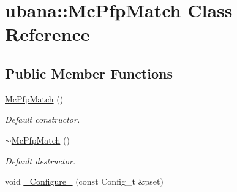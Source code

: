 \hypertarget{classubana_1_1McPfpMatch}{\section{ubana\-:\-:Mc\-Pfp\-Match Class Reference}
\label{classubana_1_1McPfpMatch}
}
\subsection*{Public Member Functions}
\begin{DoxyCompactItemize}
\item 
\hypertarget{classubana_1_1McPfpMatch_aea3e9923fdf8855d5798015b36f2d516}{\hyperlink{classubana_1_1McPfpMatch_aea3e9923fdf8855d5798015b36f2d516}{Mc\-Pfp\-Match} ()}\label{classubana_1_1McPfpMatch_aea3e9923fdf8855d5798015b36f2d516}

\begin{DoxyCompactList}\small\item\em Default constructor. \end{DoxyCompactList}\item 
\hypertarget{classubana_1_1McPfpMatch_a69ebf44a6ee96c7ee4bfab22c13423b1}{\hyperlink{classubana_1_1McPfpMatch_a69ebf44a6ee96c7ee4bfab22c13423b1}{$\sim$\-Mc\-Pfp\-Match} ()}\label{classubana_1_1McPfpMatch_a69ebf44a6ee96c7ee4bfab22c13423b1}

\begin{DoxyCompactList}\small\item\em Default destructor. \end{DoxyCompactList}\item 
\hypertarget{classubana_1_1McPfpMatch_aa6578a20f7a8194fae3caa2b19044e40}{void \hyperlink{classubana_1_1McPfpMatch_aa6578a20f7a8194fae3caa2b19044e40}{\-\_\-\-Configure\-\_\-} (const Config\-\_\-t \&pset)}\label{classubana_1_1McPfpMatch_aa6578a20f7a8194fae3caa2b19044e40}


\end{DoxyCompactItemize}
